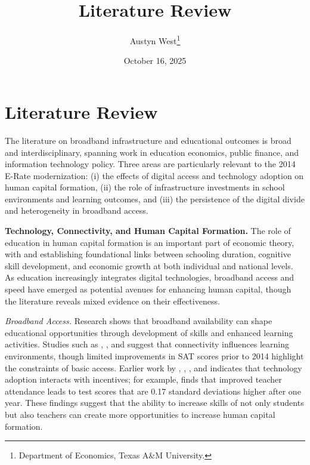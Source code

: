 


\begin{singlespace}
\title{Literature Review}
\author{Austyn West\thanks{Department of Economics, Texas A\&M University.}}
\date{October 16, 2025}
\maketitle
\end{singlespace}


\section*{Literature Review}

The literature on broadband infrastructure and educational outcomes is broad and interdisciplinary, spanning work in education economics, public finance, and information technology policy. Three areas are particularly relevant to the 2014 E-Rate modernization: (i) the effects of digital access and technology adoption on human capital formation, (ii) the role of infrastructure investments in school environments and learning outcomes, and (iii) the persistence of the digital divide and heterogeneity in broadband access.

\textbf{Technology, Connectivity, and Human Capital Formation.} The role of education in human capital formation is an important part of economic theory, with \citet{mincer1974} and \citet{hanushek2012} establishing foundational links between schooling duration, cognitive skill development, and economic growth at both individual and national levels. As education increasingly integrates digital technologies, broadband access and speed have emerged as potential avenues for enhancing human capital, though the literature reveals mixed evidence on their effectiveness.

\textit{Broadband Access.}  Research shows that broadband availability can shape educational opportunities through development of skills and enhanced learning activities. Studies such as \citet{hazlett2019}, \citet{dettling2015}, and \citet{niewoehner2025} suggest that connectivity influences learning environments, though limited improvements in SAT scores prior to 2014 \citep{hazlett2019} highlight the constraints of basic access. Earlier work by \citet{angrist2002}, \citet{angrist2009}, \citet{beuermann2013}, and \citet{duflo2012} indicates that technology adoption interacts with incentives; for example, \citet{duflo2012} finds that improved teacher attendance leads to test scores that are 0.17 standard deviations higher after one year. These findings suggest that the ability to increase skills of not only students but also teachers can create more opportunities to increase human capital formation.

